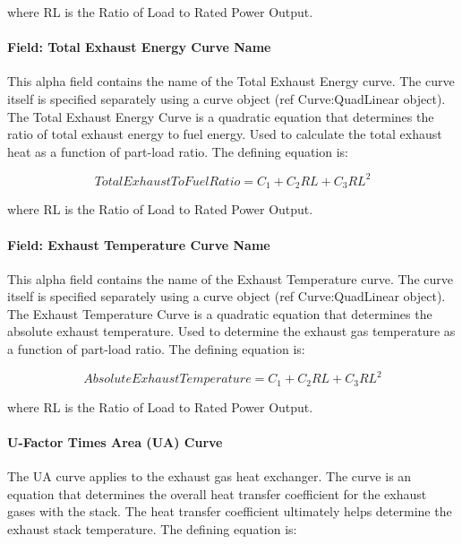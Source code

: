 where RL is the Ratio of Load to Rated Power Output.

\paragraph{Field: Total Exhaust Energy Curve Name}\label{field-total-exhaust-energy-curve-name}

This alpha field contains the name of the Total Exhaust Energy curve. The curve itself is specified separately using a curve object (ref Curve:QuadLinear object). The Total Exhaust Energy Curve is a quadratic equation that determines the ratio of total exhaust energy to fuel energy. Used to calculate the total exhaust heat as a function of part-load ratio. The defining equation is:

\begin{equation}
TotalExhaustToFuelRatio = {C_1} + {C_2}RL + {C_3}R{L^2}
\end{equation}

where RL is the Ratio of Load to Rated Power Output.

\paragraph{Field: Exhaust Temperature Curve Name}\label{field-exhaust-temperature-curve-name}

This alpha field contains the name of the Exhaust Temperature curve. The curve itself is specified separately using a curve object (ref Curve:QuadLinear object). The Exhaust Temperature Curve is a quadratic equation that determines the absolute exhaust temperature. Used to determine the exhaust gas temperature as a function of part-load ratio. The defining equation is:

\begin{equation}
AbsoluteExhaustTemperature = {C_1} + {C_2}RL + {C_3}R{L^2}
\end{equation}

where RL is the Ratio of Load to Rated Power Output.

\paragraph{U-Factor Times Area (UA) Curve}\label{u-factor-times-area-ua-curve}

The UA curve applies to the exhaust gas heat exchanger. The curve is an equation that determines the overall heat transfer coefficient for the exhaust gases with the stack. The heat transfer coefficient ultimately helps determine the exhaust stack temperature. The defining equation is:

